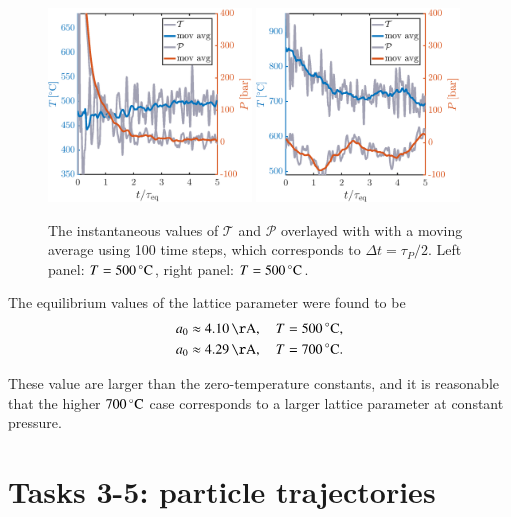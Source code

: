 \begin{figure}[!ht]
\begin{center}
  \includegraphics[width=0.48\textwidth]{../figures/TP-eq-500} 
    \includegraphics[width=0.48\textwidth]{../figures/TP-eq-700} 
  \caption{The instantaneous values of $\mathcal{T}$ and $\mathcal{P}$ overlayed with with a moving average using 100 time steps, which corresponds to $\Delta t = \tau_P/2$. Left panel: $T=\unit[500]{^\circ C}$,  right panel: $T=\unit[500]{^\circ C}$.}
  \label{fig:eq}
\end{center}
\end{figure}


The equilibrium values of the lattice parameter were found to be 
\begin{align}
a_0 &\approx \unit[4.10]{\AA}, \quad T=\unit[500]{^\circ C}, \\
a_0 &\approx \unit[4.29]{\AA}, \quad T=\unit[700]{^\circ C} .
\end{align} 

These value are larger than the zero-temperature constants, and it is reasonable that the higher $\unit[700]{^\circ C}$ case corresponds to a larger lattice parameter at constant pressure. 

\section*{Tasks 3-5: particle trajectories}

